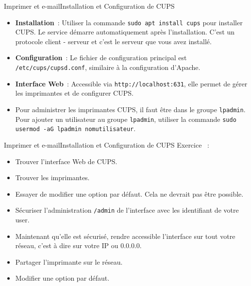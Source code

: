 \documentclass{beamer}
\begin{document}
    \begin{frame}{Imprimer et e-mail}{Installation et Configuration de CUPS}
        \begin{itemize}
            \item \textbf{Installation}~: Utiliser la commande \lstinline{sudo apt install cups} pour installer CUPS. Le service démarre automatiquement après l'installation.
            C'est un protocole client - serveur et c'est le serveur que vous avez installé.
            \item \textbf{Configuration}~: Le fichier de configuration principal est \lstinline{/etc/cups/cupsd.conf}, similaire à la configuration d'Apache.
            \item \textbf{Interface Web}~: Accessible via \lstinline{http://localhost:631}, elle permet de gérer les imprimantes et de configurer CUPS.
            \item Pour administrer les imprimantes CUPS, il faut être dans le groupe \lstinline{lpadmin}.
            Pour ajouter un utilisateur au groupe \lstinline{lpadmin}, utiliser la commande \lstinline{sudo usermod -aG lpadmin nomutilisateur}.
        \end{itemize}
    \end{frame}

    \begin{frame}{Imprimer et e-mail}{Installation et Configuration de CUPS}
        Exercice \execcounterdispinc~:
        \begin{itemize}
            \item Trouver l'interface Web de CUPS.
            \item Trouver les imprimantes.
            \item Essayer de modifier une option par défaut.
            Cela ne devrait pas être possible.
            \item Sécuriser l'administration \lstinline{/admin} de l'interface avec les identifiant de votre user.
            \item Maintenant qu'elle est sécurisé, rendre accessible l'interface sur tout votre réseau, c'est à dire sur votre IP ou 0.0.0.0.
            \item Partager l'imprimante sur le réseau.
            \item Modifier une option par défaut.
        \end{itemize}
    \end{frame}
\end{document}
